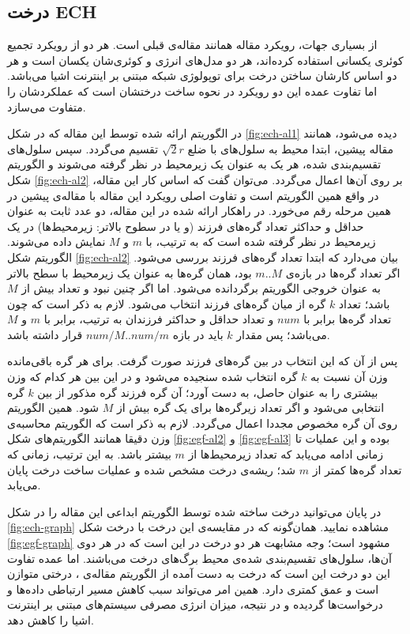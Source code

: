 \subsection{درخت ECH}
از بسیاری جهات، رویکرد مقاله \cite{} همانند مقاله‌ی قبلی است. هر دو از رویکرد تجمیع کوئری یکسانی استفاده کرده‌اند، هر دو مدل‌های انرژی و کوئری‌شان یکسان است و هر دو اساس کارشان ساختن درخت برای توپولوژی شبکه مبتنی بر اینترنت اشیا می‌باشد. اما تفاوت عمده این دو رویکرد در نحوه ساخت درختشان است که عملکردشان را متفاوت می‌سازد.

\par
در الگوریتم ارائه شده توسط این مقاله که در شکل \ref{fig:ech-al1} دیده می‌شود، همانند مقاله پیشین، ابتدا محیط به سلول‌های با ضلع $\sqrt{2}r$ تقسیم می‌گردد. سپس سلول‌های تقسیم‌بندی شده، هر یک به عنوان یک زیرمحیط در نظر گرفته می‌شوند و الگوریتم شکل \ref{fig:ech-al2} بر روی آن‌ها اعمال می‌گردد. می‌توان گفت که اساس کار این مقاله، در واقع همین الگوریتم است و تفاوت اصلی رویکرد این مقاله با مقاله‌ی پیشین در همین مرحله رقم می‌خورد. در راهکار ارائه شده در این مقاله، دو عدد ثابت به عنوان حداقل و حداکثر تعداد گره‌های فرزند (و یا در سطوح بالاتر: زیرمحیط‌ها) در یک زیرمحیط در نظر گرفته شده است که به ترتیب، با $m$ و $M$ نمایش داده می‌شوند. الگوریتم شکل \ref{fig:ech-al2} بیان می‌دارد که ابتدا تعداد گره‌های فرزند بررسی می‌شود. اگر تعداد گره‌ها در بازه‌ی $m..M$ بود، همان گره‌ها به عنوان یک زیرمحیط با سطح بالاتر به عنوان خروجی الگوریتم برگردانده می‌شود. اما اگر چنین نبود و تعداد بیش از $M$ باشد؛ تعداد $k$ گره از میان گره‌های فرزند انتخاب می‌شود. لازم به ذکر است که چون تعداد گره‌ها برابر با $num$ و تعداد حداقل و حداکثر فرزندان به ترتیب، برابر با $m$ و $M$ می‌باشد؛ پس مقدار $k$ باید در بازه $num/M..num/m$ قرار داشته باشد.
\par
پس از آن که این انتخاب در بین گره‌های فرزند صورت گرفت. برای هر گره باقی‌مانده وزن آن نسبت به $k$ گره انتخاب شده سنجیده می‌شود و در این بین هر کدام که وزن بیشتری را به عنوان حاصل، به دست آورد؛ آن گره فرزند گره مذکور از بین $k$ گره انتخابی می‌شود و اگر تعداد زیرگره‌ها برای یک گره بیش از $M$ شود. همین الگوریتم روی آن گره مخصوص مجددا اعمال می‌گردد. لازم به ذکر است که الگوریتم محاسبه‌ی وزن دقیقا همانند الگوریتم‌های شکل \ref{fig:egf-al2} و
\ref{fig:egf-al3}
 بوده و این عملیات تا زمانی ادامه می‌یابد که تعداد زیرمحیط‌ها از $m$ بیشتر باشد. به این ترتیب، زمانی که تعداد گره‌ها کمتر از $m$ شد؛ ریشه‌ی درخت مشخص شده و عملیات ساخت درخت پایان می‌یابد.

\par
در پایان می‌توانید درخت ساخته شده توسط الگوریتم ابداعی این مقاله را در شکل \ref{fig:ech-graph} مشاهده نمایید. همان‌گونه که در مقایسه‌ی این درخت با درخت شکل \ref{fig:egf-graph} مشهود است؛ وجه مشابهت هر دو درخت در این است که در هر دوی آن‌ها، سلول‌های تقسیم‌بندی شده‌ی محیط برگ‌های درخت می‌باشند. اما عمده تفاوت این دو درخت این است که درخت به دست آمده از الگوریتم مقاله‌ی \cite{}، درختی متوازن است و عمق کمتری دارد. همین امر می‌تواند سبب کاهش مسیر ارتباطی داده‌ها و درخواست‌ها گردیده و در نتیجه، میزان انرژی مصرفی سیستم‌های مبتنی بر اینترنت اشیا را کاهش دهد.


